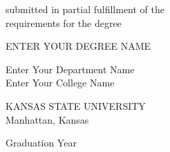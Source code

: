 \begin{center}
   \vspace{0.5cm}
   \begin{singlespace}
   submitted in partial fulfillment of the\\
   requirements for the degree\\
   \end{singlespace}

   \vspace{0.5cm}



   {\large ENTER YOUR DEGREE NAME}\\
   \vspace{0.5cm}


   \begin{singlespace}
   Enter Your Department Name\\
   Enter Your College Name\\
   \end{singlespace}

   \vspace{0.5cm}

   \begin{singlespace}
   {\Large KANSAS STATE UNIVERSITY}\\
   Manhattan, Kansas\\
   \end{singlespace}


   Graduation Year\\
   \vspace{1cm}

\end{center}
